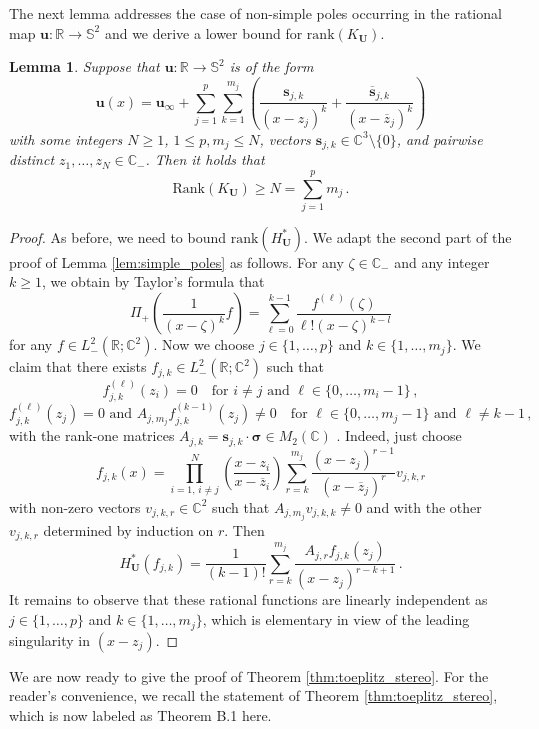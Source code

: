 \documentclass[11pt,reqno]{amsart}
\newtheorem{lem}{Lemma}[section]
\theoremstyle{definition}
\theoremstyle{remark}
\theoremstyle{remark}
\numberwithin{equation}{section}
\newcommand{\C}{\mathbb{C}}
\newcommand{\R}{\mathbb{R}}
\newcommand{\Ss}{\mathbb{S}}
\newcommand{\ov}{\overline}
\newcommand{\rank}{\mathrm{rank}}
\newcommand{\sv}{\mathbf{s}}
\newcommand{\uu}{\mathbf{u}}
\newcommand{\Ub}{\mathbf{U}}
\begin{document}
\begin{appendix}
The next lemma addresses the case of non-simple poles occurring in the rational map $\uu : \R \to \Ss^2$ and we derive a lower bound for $\rank(K_\Ub)$.

\begin{lem} \label{lem:mult_poles}
Suppose that $\uu : \R \to \Ss^2$ is of the form
$$
\uu(x) = \uu_\infty + \sum_{j=1}^p \sum_{k=1}^{m_j} \left ( \frac{\sv_{j,k}}{(x-z_j)^k} + \frac{\ov{\sv}_{j,k}}{(x-\ov{z}_j)^k} \right )
$$
with some integers $N \geq 1$, $1 \leq p,m_j \leq N$, vectors $\sv_{j,k} \in \C^3 \setminus \{ 0 \}$, and pairwise distinct $z_1, \ldots, z_N \in \C_-$. Then it holds that
$$
\mathrm{Rank}(K_\Ub) \geq N = \sum_{j=1}^p m_j \, .
$$
\end{lem}

\begin{proof}
As before, we need to bound $\rank(H^*_\Ub)$.  We adapt the second part of the proof of Lemma \ref{lem:simple_poles} as follows. For any $\zeta \in \C_-$ and any integer $k \geq 1$, we obtain by Taylor's formula that
$$
\Pi_+\left ( \frac{1}{(x-\zeta)^k} f \right ) = \sum_{\ell=0}^{k-1} \frac{f^{(\ell)}(\zeta)}{\ell! (x-\zeta)^{k-l}} 
$$
for any $f  \in L^2_-(\R; \C^2)$. Now we choose $j \in \{ 1, \ldots, p \}$ and $k \in \{ 1, \ldots, m_j \}$. We claim that there exists $f_{j,k} \in L^2_-(\R; \C^2)$ such that
$$
f_{j,k}^{(\ell)} (z_i) = 0 \quad \mbox{for $i \neq j$ and $\ell \in \{0, \ldots, m_i-1 \}$} \, ,
$$
$$
\mbox{$f_{j,k}^{(\ell)}(z_j) = 0$ and $A_{j,m_j} f^{(k-1)}_{j,k}(z_j) \neq 0$} \quad \mbox{for $\ell \in \{0, \ldots, m_j-1 \}$ and $\ell \neq k-1$} \, ,
$$
with the rank-one matrices $A_{j,k} = \sv_{j,k} \cdot \bm{\sigma} \in M_2(\C)$ . Indeed, just choose
$$
f_{j,k}(x) = \prod_{i=1, \, i \neq j}^N \left ( \frac{x-z_i}{x-\ov{z}_i} \right ) \sum_{r=k}^{m_j} \frac{(x-z_j)^{r-1}}{(x-\ov{z}_j)^{r}} v_{j,k,r}
$$
with non-zero vectors $v_{j,k,r} \in \C^2$ such that $A_{j,m_j} v_{j,k,k} \neq 0$ and with the other $v_{j,k,r}$ determined by induction on $r$. Then
$$
H^*_{\Ub}(f_{j,k}) = \frac{1}{(k-1)!} \sum_{r=k}^{m_j} \frac{A_{j,r} f_{j,k}(z_j)}{(x-z_j)^{r-k+1}} \, .
$$
It remains to observe that these rational functions are linearly independent as $j \in \{1, \ldots, p \}$ and $k \in \{1, \ldots, m_j \}$, which is elementary in view of the leading singularity in $(x-z_j)$.
\end{proof}

We are now ready to give the proof of Theorem \ref{thm:toeplitz_stereo}. For the reader's convenience, we recall the statement of Theorem \ref{thm:toeplitz_stereo}, which is now labeled as Theorem B.1 here.


\end{appendix}
\end{document}
